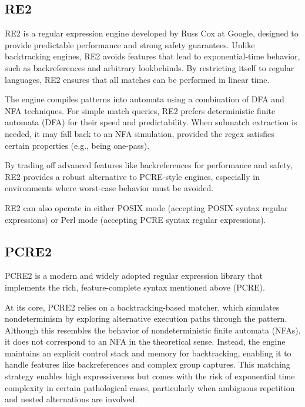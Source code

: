\subsection{RE2}
RE2 is a regular expression engine developed by Russ Cox at Google, designed to provide predictable performance and strong safety guarantees. Unlike backtracking engines, RE2 avoids features that lead to exponential-time behavior, such as backreferences and arbitrary lookbehinds. By restricting itself to regular languages, RE2 ensures that all matches can be performed in linear time. \cite{russ_cox_regexp3}

The engine compiles patterns into automata using a combination of DFA and NFA techniques. For simple match queries, RE2 prefers deterministic finite automata (DFA) for their speed and predictability. When submatch extraction is needed, it may fall back to an NFA simulation, provided the regex satisfies certain properties (e.g., being one-pass). \cite{russ_cox_regexp3}

By trading off advanced features like backreferences for performance and safety, RE2 provides a robust alternative to PCRE-style engines, especially in environments where worst-case behavior must be avoided.

RE2 can also operate in either POSIX mode (accepting POSIX syntax regular expressions) or Perl mode (accepting PCRE syntax regular expressions). \cite{russ_cox_re2}

\subsection{PCRE2}
PCRE2 is a modern and widely adopted regular expression library that implements the rich, feature-complete syntax mentioned above (PCRE). \cite{sw_pcre2}

At its core, PCRE2 relies on a backtracking-based matcher, which simulates nondeterminism by exploring alternative execution paths through the pattern. Although this resembles the behavior of nondeterministic finite automata (NFAs), it does not correspond to an NFA in the theoretical sense. Instead, the engine maintains an explicit control stack and memory for backtracking, enabling it to handle features like backreferences and complex group captures. This matching strategy enables high expressiveness but comes with the risk of exponential time complexity in certain pathological cases, particularly when ambiguous repetition and nested alternations are involved. \cite{sw_pcre2}

